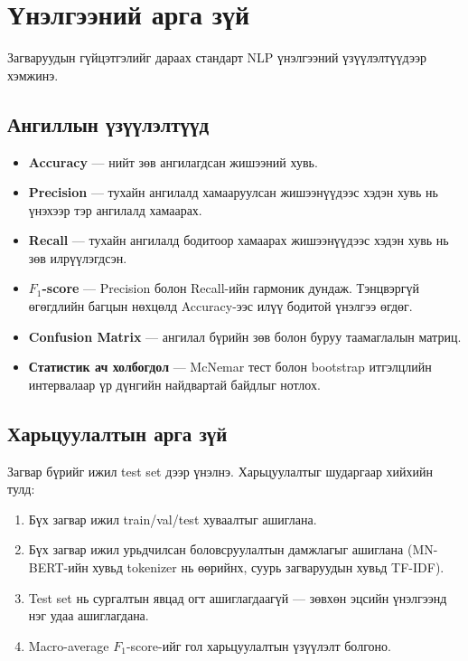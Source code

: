 \section{Үнэлгээний арга зүй}

Загваруудын гүйцэтгэлийг дараах стандарт NLP үнэлгээний үзүүлэлтүүдээр хэмжинэ.

\subsection{Ангиллын үзүүлэлтүүд}

\begin{itemize}
  \item \textbf{Accuracy} --- нийт зөв ангилагдсан жишээний хувь.
  \item \textbf{Precision} --- тухайн ангилалд хамааруулсан жишээнүүдээс хэдэн
        хувь нь үнэхээр тэр ангилалд хамаарах.
  \item \textbf{Recall} --- тухайн ангилалд бодитоор хамаарах жишээнүүдээс хэдэн
        хувь нь зөв илрүүлэгдсэн.
  \item \textbf{$F_1$-score} --- Precision болон Recall-ийн гармоник дундаж.
        Тэнцвэргүй өгөгдлийн багцын нөхцөлд Accuracy-ээс илүү бодитой үнэлгээ өгдөг.
  \item \textbf{Confusion Matrix} --- ангилал бүрийн зөв болон буруу
        таамаглалын матриц.
  \item \textbf{Статистик ач холбогдол} --- McNemar тест болон bootstrap
        итгэлцлийн интервалаар үр дүнгийн найдвартай байдлыг нотлох.
\end{itemize}

\subsection{Харьцуулалтын арга зүй}

Загвар бүрийг ижил test set дээр үнэлнэ. Харьцуулалтыг шударгаар хийхийн тулд:
\begin{enumerate}
  \item Бүх загвар ижил train/val/test хуваалтыг ашиглана.
  \item Бүх загвар ижил урьдчилсан боловсруулалтын дамжлагыг ашиглана (MN-BERT-ийн хувьд
        tokenizer нь өөрийнх, суурь загваруудын хувьд TF-IDF).
  \item Test set нь сургалтын явцад огт ашиглагдаагүй --- зөвхөн эцсийн
        үнэлгээнд нэг удаа ашиглагдана.
  \item Macro-average $F_1$-score-ийг гол харьцуулалтын үзүүлэлт болгоно.
\end{enumerate}

